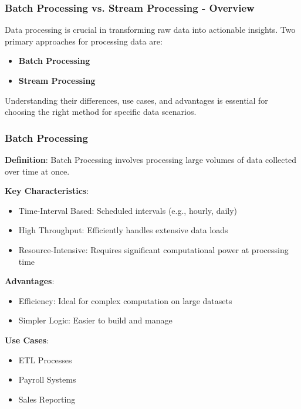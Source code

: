 \documentclass[aspectratio=169]{beamer}
\begin{document}
\begin{frame}[fragile]
    \frametitle{Batch Processing vs. Stream Processing - Overview}
    Data processing is crucial in transforming raw data into actionable insights. Two primary approaches for processing data are:
    \begin{itemize}
        \item \textbf{Batch Processing}
        \item \textbf{Stream Processing}
    \end{itemize}
    Understanding their differences, use cases, and advantages is essential for choosing the right method for specific data scenarios.
\end{frame}

\begin{frame}[fragile]
    \frametitle{Batch Processing}
    \textbf{Definition}: Batch Processing involves processing large volumes of data collected over time at once.
    
    \textbf{Key Characteristics}:
    \begin{itemize}
        \item Time-Interval Based: Scheduled intervals (e.g., hourly, daily)
        \item High Throughput: Efficiently handles extensive data loads
        \item Resource-Intensive: Requires significant computational power at processing time
    \end{itemize}
    
    \textbf{Advantages}:
    \begin{itemize}
        \item Efficiency: Ideal for complex computation on large datasets
        \item Simpler Logic: Easier to build and manage
    \end{itemize}
    
    \textbf{Use Cases}:
    \begin{itemize}
        \item ETL Processes
        \item Payroll Systems
        \item Sales Reporting
    \end{itemize}
\end{frame}
\end{document}
